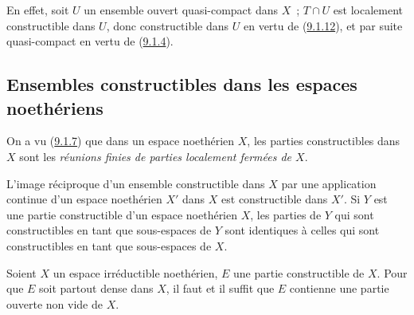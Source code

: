 En effet, soit $U$ un ensemble ouvert quasi-compact dans $X$~; $T\cap U$ est
localement constructible dans $U$, donc constructible dans $U$ en vertu de
(\hyperref[0.9.1.12-fr]{9.1.12}), et par suite quasi-compact en vertu de
(\hyperref[0.9.1.4-fr]{9.1.4}).

\subsection{Ensembles constructibles dans les espaces noethériens}
\label{subsection:0.9.2-fr}

\begin{env}[9.2.1]
\label{0.9.2.1-fr}
On a vu (\hyperref[0.9.1.7-fr]{9.1.7}) que dans un espace noethérien $X$, les
parties constructibles dans $X$ sont les \emph{réunions finies de parties
localement fermées de $X$}.

L'image réciproque d'un ensemble constructible dans $X$ par une application
continue d'un espace noethérien $X'$ dans $X$ est constructible dans $X'$.
Si $Y$ est une partie constructible d'un espace noethérien $X$, les parties
de $Y$ qui sont constructibles en tant que sous-espaces de $Y$ sont
identiques à celles qui sont constructibles en tant que sous-espaces de $X$.
\end{env}

\begin{proposition}[9.2.2]
\label{0.9.2.2-fr}
Soient $X$ un espace irréductible noethérien, $E$ une partie constructible de
$X$. Pour que $E$ soit partout dense dans $X$, il faut et il suffit que $E$
contienne une partie ouverte non vide de $X$.
\end{proposition}

